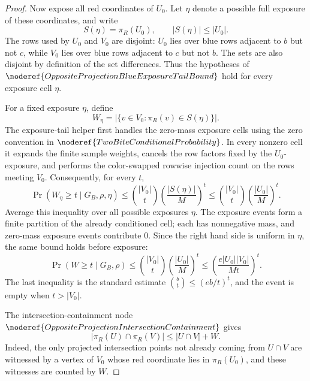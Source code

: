 \begin{proof}
Now expose all red coordinates of \(U_0\).  Let \(\eta\) denote a possible
full exposure of these coordinates, and write
\[
S(\eta)=\pi_R(U_0),\qquad |S(\eta)|\le |U_0|.
\]
The rows used by \(U_0\) and \(V_0\) are disjoint: \(U_0\) lies over blue
rows adjacent to \(b\) but not \(c\), while \(V_0\) lies over blue
rows adjacent to \(c\) but not \(b\).  The sets are also disjoint by definition of
the set differences.  Thus the hypotheses of
\(\noderef{OppositeProjectionBlueExposureTailBound}\) hold for every exposure
cell \(\eta\).

For a fixed exposure \(\eta\), define
\[
W_\eta=|\{v\in V_0:\pi_R(v)\in S(\eta)\}|.
\]
The exposure-tail helper first handles the zero-mass exposure cells using the
zero convention in \(\noderef{TwoBiteConditionalProbability}\).  In every
nonzero cell it expands the finite sample weights, cancels the row factors
fixed by the \(U_0\)-exposure, and performs the color-swapped rowwise
injection count on the rows meeting \(V_0\).  Consequently, for every \(t\),
\[
\Pr(W_\eta\ge t\mid G_B,\rho,\eta)
\le \binom{|V_0|}{t}\left(\frac{|S(\eta)|}{M}\right)^t
\le \binom{|V_0|}{t}\left(\frac{|U_0|}{M}\right)^t .
\]
Average this inequality over all possible exposures \(\eta\).  The exposure
events form a finite partition of the already conditioned cell; each has
nonnegative mass, and zero-mass exposure events contribute \(0\).  Since the
right hand side is uniform in \(\eta\), the same bound holds before exposure:
\[
\Pr(W\ge t\mid G_B,\rho)
\le \binom{|V_0|}{t}\left(\frac{|U_0|}{M}\right)^t
\le \left(\frac{e|U_0||V_0|}{Mt}\right)^t.
\]
The last inequality is the standard estimate
\(\binom bt\le(eb/t)^t\), and the event is empty when \(t>|V_0|\).

The intersection-containment node
\(\noderef{OppositeProjectionIntersectionContainment}\) gives
\[
|\pi_R(U)\cap\pi_R(V)|
\le |U\cap V|+W.
\]
Indeed, the only projected intersection points not already coming from
\(U\cap V\) are witnessed by a vertex of \(V_0\) whose red coordinate lies in
\(\pi_R(U_0)\), and these witnesses are counted by \(W\).


\end{proof}
